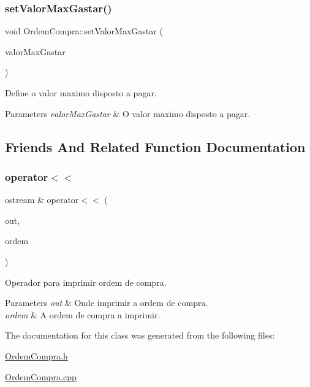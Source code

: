 \subsubsection{\texorpdfstring{set\+Valor\+Max\+Gastar()}{setValorMaxGastar()}}
{\footnotesize\ttfamily void Ordem\+Compra\+::set\+Valor\+Max\+Gastar (\begin{DoxyParamCaption}\item[{float}]{valor\+Max\+Gastar }\end{DoxyParamCaption})\hspace{0.3cm}{\ttfamily [inline]}}



Define o valor maximo disposto a pagar. 


\begin{DoxyParams}{Parameters}
{\em valor\+Max\+Gastar} & O valor maximo disposto a pagar. \\
\hline
\end{DoxyParams}


\subsection{Friends And Related Function Documentation}
\hypertarget{class_ordem_compra_af2f3323b475ba777c890c63648d24e5d}{}\label{class_ordem_compra_af2f3323b475ba777c890c63648d24e5d} 
\subsubsection{\texorpdfstring{operator$<$$<$}{operator<<}}
{\footnotesize\ttfamily ostream \& operator$<$$<$ (\begin{DoxyParamCaption}\item[{ostream \&}]{out,  }\item[{const \hyperlink{class_ordem_compra}{Ordem\+Compra} \&}]{ordem }\end{DoxyParamCaption})\hspace{0.3cm}{\ttfamily [friend]}}



Operador para imprimir ordem de compra. 


\begin{DoxyParams}{Parameters}
{\em out} & Onde imprimir a ordem de compra. \\
\hline
{\em ordem} & A ordem de compra a imprimir. \\
\hline
\end{DoxyParams}


The documentation for this class was generated from the following files\+:\begin{DoxyCompactItemize}
\item 
\hyperlink{_ordem_compra_8h}{Ordem\+Compra.\+h}\item 
\hyperlink{_ordem_compra_8cpp}{Ordem\+Compra.\+cpp}\end{DoxyCompactItemize}
